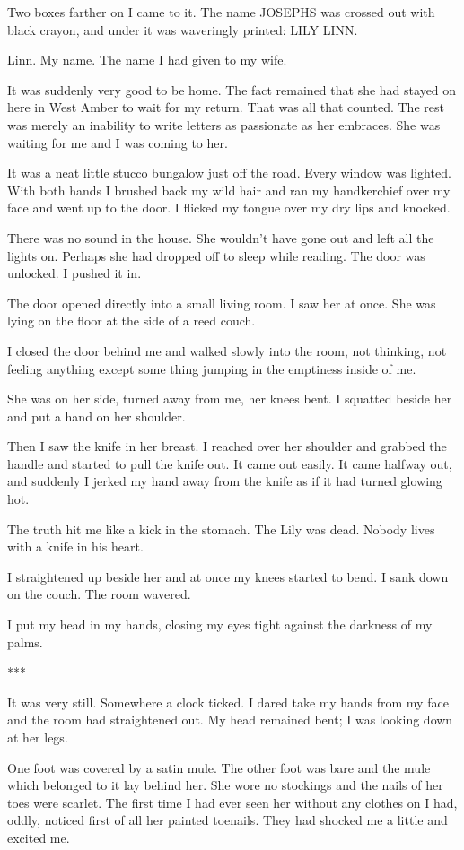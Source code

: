 \documentclass{novel}
\begin{document}
Two boxes farther on I came to it. The name JOSEPHS was crossed out with black crayon, and under it was waveringly printed: LILY LINN.

Linn. My name. The name I had given to my wife.

It was suddenly very good to be home. The fact remained that she had stayed on here in West Amber to wait for my return. That was all that counted. The rest was merely an inability to write letters as passionate as her embraces. She was waiting for me and I was coming to her.

It was a neat little stucco bungalow just off the road. Every window was lighted. With both hands I brushed back my wild hair and ran my handkerchief over my face and went up to the door. I flicked my tongue over my dry lips and knocked.

There was no sound in the house. She wouldn’t have gone out and left all the lights on. Perhaps she had dropped off to sleep while reading. The door was unlocked. I pushed it in.

The door opened directly into a small living room. I saw her at once. She was lying on the floor at the side of a reed couch.

I closed the door behind me and walked slowly into the room, not thinking, not feeling anything except some thing jumping in the emptiness inside of me.

She was on her side, turned away from me, her knees bent. I squatted beside her and put a hand on her shoulder.

Then I saw the knife in her breast. I reached over her shoulder and grabbed the handle and started to pull the knife out. It came out easily. It came halfway out, and suddenly I jerked my hand away from the knife as if it had turned glowing hot.

The truth hit me like a kick in the stomach. The Lily was dead. Nobody lives with a knife in his heart.

I straightened up beside her and at once my knees started to bend. I sank down on the couch. The room wavered.

I put my head in my hands, closing my eyes tight against the darkness of my palms.

***

It was very still. Somewhere a clock ticked. I dared take my hands from my face and the room had straightened out. My head remained bent; I was looking down at her legs.

One foot was covered by a satin mule. The other foot was bare and the mule which belonged to it lay behind her. She wore no stockings and the nails of her toes were scarlet. The first time I had ever seen her without any clothes on I had, oddly, noticed first of all her painted toenails. They had shocked me a little and excited me.
\end{document}

